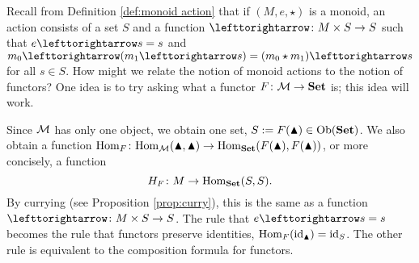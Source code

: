 \documentclass[CT4S-EN-RU]{subfiles}
\begin{document}
\begin{blockRUS}
\end{blockRUS}

\paragraph{} ~\\

\begin{blockENG}
Recall from Definition \ref{def:monoid action} that if $(M,e,\star)$ is a monoid, an action consists of a set $S$ and a function $\acts\taking M\times S\to S$ such that $e\acts s=s$ and $m_0\acts (m_1\acts s)=(m_0\star m_1)\acts s$ for all $s\in S$. How might we relate the notion of monoid actions to the notion of functors? One idea is to try asking what a functor $F\colon\mathcal{M}\rightarrow{\mathbf{Set}}$ is; this idea will work.
\end{blockENG}

\begin{blockRUS}
\end{blockRUS}

\begin{blockENG}
Since $\mathcal{M}$ has only one object, we obtain one set, $S:=F(\blacktriangle)\in\textnormal{Ob}({\mathbf{Set}})$. We also obtain a function $\textnormal{Hom}_F\colon\textnormal{Hom}_\mathcal{M}(\blacktriangle,\blacktriangle)\rightarrow\textnormal{Hom}_{\mathbf{Set}}(F(\blacktriangle),F(\blacktriangle))$, or more concisely, a function $$H_F\colon M\rightarrow\textnormal{Hom}_{\mathbf{Set}}(S,S).$$ By currying (see Proposition \ref{prop:curry}), this is the same as a function $\acts\taking M\times S\to S$. The rule that $e\acts s=s$ becomes the rule that functors preserve identities, $\textnormal{Hom}_F(\textnormal{id}_\blacktriangle)=\textnormal{id}_S$. The other rule is equivalent to the composition formula for functors. 
\end{blockENG}

\begin{blockRUS}
\end{blockRUS}

\paragraph{} ~\\

\end{document}
